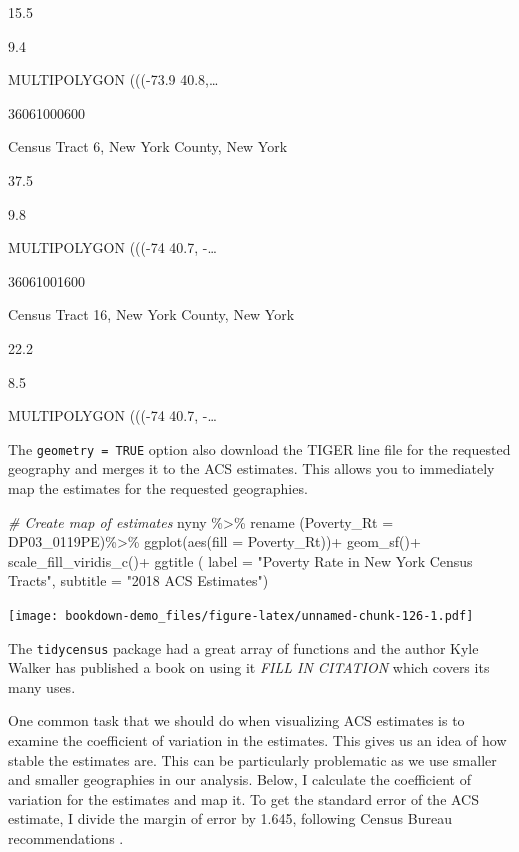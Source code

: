 \documentclass[
]{article}
\newenvironment{Shaded}{\begin{snugshade}}{\end{snugshade}}
\newcommand{\AttributeTok}[1]{\textcolor[rgb]{0.77,0.63,0.00}{#1}}
\newcommand{\CommentTok}[1]{\textcolor[rgb]{0.56,0.35,0.01}{\textit{#1}}}
\newcommand{\FunctionTok}[1]{\textcolor[rgb]{0.00,0.00,0.00}{#1}}
\newcommand{\NormalTok}[1]{#1}
\newcommand{\SpecialCharTok}[1]{\textcolor[rgb]{0.00,0.00,0.00}{#1}}
\newcommand{\StringTok}[1]{\textcolor[rgb]{0.31,0.60,0.02}{#1}}
\begin{document}
15.5

9.4

MULTIPOLYGON (((-73.9 40.8,\ldots{}

36061000600

Census Tract 6, New York County, New York

37.5

9.8

MULTIPOLYGON (((-74 40.7, -\ldots{}

36061001600

Census Tract 16, New York County, New York

22.2

8.5

MULTIPOLYGON (((-74 40.7, -\ldots{}

The \texttt{geometry\ =\ TRUE} option also download the TIGER line file for the requested geography and merges it to the ACS estimates. This allows you to immediately map the estimates for the requested geographies.

\begin{Shaded}
\begin{Highlighting}[]
\CommentTok{\# Create map of estimates}
\NormalTok{nyny }\SpecialCharTok{\%\textgreater{}\%} 
  \FunctionTok{rename}\NormalTok{ (}\AttributeTok{Poverty\_Rt =}\NormalTok{ DP03\_0119PE)}\SpecialCharTok{\%\textgreater{}\%}
  \FunctionTok{ggplot}\NormalTok{(}\FunctionTok{aes}\NormalTok{(}\AttributeTok{fill =}\NormalTok{ Poverty\_Rt))}\SpecialCharTok{+}
  \FunctionTok{geom\_sf}\NormalTok{()}\SpecialCharTok{+}
  \FunctionTok{scale\_fill\_viridis\_c}\NormalTok{()}\SpecialCharTok{+}
  \FunctionTok{ggtitle}\NormalTok{ ( }\AttributeTok{label =} \StringTok{"Poverty Rate in New York Census Tracts"}\NormalTok{, }
            \AttributeTok{subtitle =} \StringTok{"2018 ACS Estimates"}\NormalTok{)}
\end{Highlighting}
\end{Shaded}

\texttt{[image: bookdown-demo\_files/figure-latex/unnamed-chunk-126-1.pdf]}

The \texttt{tidycensus} package had a great array of functions and the author Kyle Walker has published a book on using it \emph{FILL IN CITATION} which covers its many uses.

One common task that we should do when visualizing ACS estimates is to examine the coefficient of variation in the estimates. This gives us an idea of how stable the estimates are. This can be particularly problematic as we use smaller and smaller geographies in our analysis. Below, I calculate the coefficient of variation for the estimates and map it. To get the standard error of the ACS estimate, I divide the margin of error by 1.645, following Census Bureau recommendations \citep{us_census_bureau_worked_nodate}.
\end{document}
